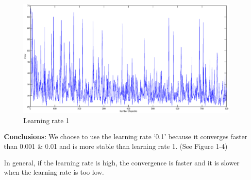 \documentclass[a4paper]{article}
\begin{document}
\begin{itemize}
	\begin{tcolorbox}
		\begin{figure}[H]
			\begin{center}
				\includegraphics[width=1.0\textwidth]{learningrate1.eps}
				\caption{ Learning rate 1}\label{fig:learn1}
			\end{center}
		\end{figure}
	\end{tcolorbox}
	
	\textbf{Conclusions}: \newline
	  We choose to use the learning rate `0.1' because it converges faster than 0.001 \& 0.01 and is more stable than learning rate 1. (See Figure 1-4)
	  
	  In general, if the learning rate is high, the convergence is faster and it is slower when the learning rate is too low.

\end{itemize}
\end{document}
